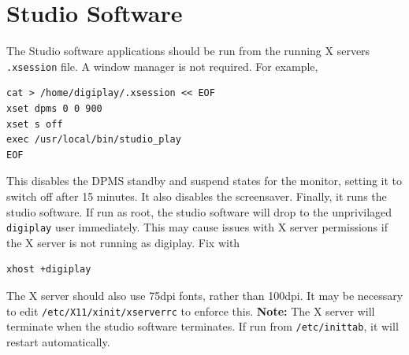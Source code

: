 \documentclass[a4paper,12pt]{report}
\numberwithin{equation}{section}
\begin{document}
\section{Studio Software}
The Studio software applications should be run from the running X servers \texttt{.xsession} file. A window manager is not required. For example,
\begin{lstlisting}
cat > /home/digiplay/.xsession << EOF
xset dpms 0 0 900
xset s off
exec /usr/local/bin/studio_play
EOF
\end{lstlisting}
This disables the DPMS standby and suspend states for the monitor, setting it to switch off after 15 minutes. It also disables the screensaver. Finally, it runs the studio software. If run as root, the studio software will drop to the unprivilaged \texttt{digiplay} user immediately. This may cause issues with X server permissions if the X server is not running as digiplay. Fix with
\begin{lstlisting}
xhost +digiplay
\end{lstlisting}
The X server should also use 75dpi fonts, rather than 100dpi. It may be necessary to edit \texttt{/etc/X11/xinit/xserverrc} to enforce this.
\textbf{Note:} The X server will terminate when the studio software terminates. If run from \texttt{/etc/inittab}, it will restart automatically.
\end{document}

